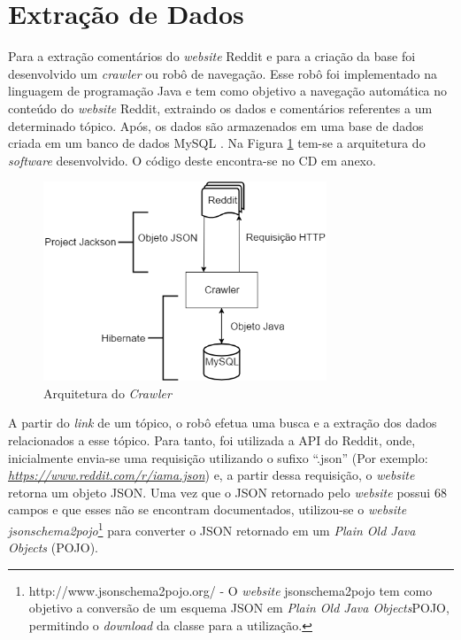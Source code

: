 \section{Extração de Dados}
\label{cap:Extracao}

Para a extração comentários do \textit{website} Reddit e para a criação da base
foi desenvolvido um \textit{crawler} ou robô de navegação. Esse robô foi
implementado na linguagem de programação Java e tem como objetivo a navegação
automática no conteúdo do \textit{website} Reddit, extraindo os dados e comentários referentes a um
determinado tópico. Após, os dados são armazenados em uma base de dados criada
em um banco de dados MySQL \cite{Widenius:2002:MRM:560480}.
Na Figura \ref{fig:crawler} tem-se a arquitetura do \textit{software}
desenvolvido. O código deste encontra-se no CD em anexo.

\begin{figure}[htbp]
\centering
\includegraphics[height=225px]{imagens/arquitetura.png}
\caption{Arquitetura do \textit{Crawler}}
\label{fig:crawler}
\end{figure}

A partir do \textit{link} de um tópico, o robô efetua uma busca e a
extração dos dados relacionados a esse tópico. Para tanto, foi utilizada a
\ac{API} do Reddit, onde, inicialmente envia-se uma requisição utilizando o
sufixo ``.json'' (Por exemplo:
\textit{\url{https://www.reddit.com/r/iama.json}}) e, a partir dessa requisição,
o \textit{website} retorna um objeto \ac{JSON}. Uma vez que o \ac{JSON}
retornado pelo \textit{website} possui 68 campos e que esses não se encontram
documentados, utilizou-se o \textit{website}
\textit{jsonschema2pojo}\footnote{http://www.jsonschema2pojo.org/ - O
\textit{website} jsonschema2pojo tem como objetivo a conversão de um esquema \ac{JSON} em
\textit{Plain Old Java Objects}\ac{POJO}, permitindo o \textit{download} da classe para a utilização.} para converter o
JSON retornado em um \textit{Plain Old Java Objects} (\ac{POJO}).

